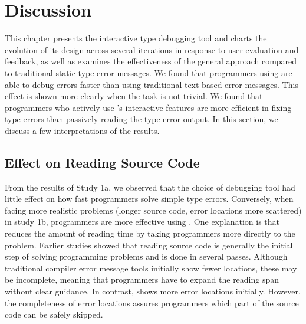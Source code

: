 \section{Discussion}


This chapter presents the interactive type debugging tool \chameleon{} and charts the evolution of its design across several iterations in response to user evaluation and feedback, as well as examines the effectiveness of the general approach compared to traditional static type error messages. We found that programmers using \chameleon{} are able to debug errors faster than using traditional text-based error messages. This effect is shown more clearly when the task is not trivial. We found that programmers who actively use \chameleon{}'s interactive features are more efficient in fixing type errors than passively reading the type error output. In this section, we discuss a few interpretations of the results.


\subsection{Effect on Reading Source Code}
From the results of Study 1a, we observed that the choice of debugging tool had little effect on how fast programmers solve simple type errors. Conversely, when facing more realistic problems (longer source code, error locations more scattered) in study 1b, programmers are more effective using \chameleon{}. One explanation is that \chameleon{} reduces the amount of reading time by taking programmers more directly to the problem. Earlier studies \cite{Jbara2015-gr, Peitek2020-nb} showed that reading source code is generally the initial step of solving programming problems and is done in several passes. Although traditional compiler error message tools initially show fewer locations, these may be incomplete, meaning that programmers have to expand the reading span without clear guidance. In contrast, \chameleon{} shows more error locations initially. However, the completeness of error locations assures programmers which part of the source code can be safely skipped.

